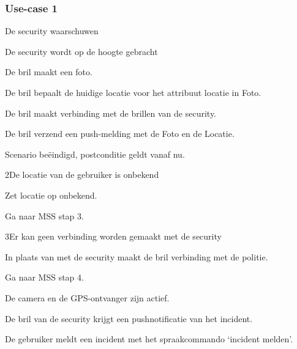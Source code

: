 \documentclass[12pt,a4paper,oneside]{article}
\begin{document}
\subsubsection{Use-case 1}
\begin{uc}{De security waarschuwen}

    \begin{uc-mss}{De security wordt op de hoogte gebracht}
    \item De bril maakt een foto.
\item De bril bepaalt de huidige locatie voor het attribuut locatie in Foto.
    \item De bril maakt verbinding met de brillen van de security.
    \item De bril verzend een push-melding met de Foto en de Locatie.
\item Scenario be\"eindigd, postconditie geldt vanaf nu.
    \end{uc-mss}

    \begin{uc-ext}

     \begin{uc-fail}{2}{De locatie van de gebruiker is onbekend}
        \item Zet locatie op onbekend. 
	\item Ga naar MSS stap 3.
        \end{uc-fail}

        \begin{uc-fail}{3}{Er kan geen verbinding worden gemaakt met de security}
        \item In plaats van met de security maakt de bril verbinding met de politie.
        \item Ga naar MSS stap 4.
        \end{uc-fail}

     \end{uc-ext}

    \begin{uc-pre}
    \item De camera en de GPS-ontvanger zijn actief.
    \end{uc-pre}

    \begin{uc-post}
    \item De bril van de security krijgt een pushnotificatie van het incident.    \end{uc-post}

    \begin{uc-trig}
    \item De gebruiker meldt een incident met het spraakcommando `incident melden'.
    \end{uc-trig}

\end{uc}
\setcounter{section}{2}
\end{document}
